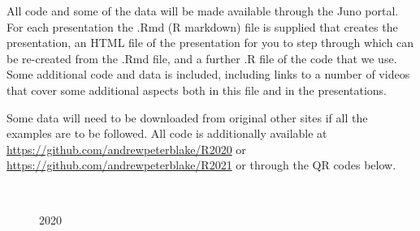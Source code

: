 \documentclass[
  letterpaper,
]{book}
\begin{document}
All code and some of the data will be made available through the Juno
portal. For each presentation the .Rmd (R markdown) file is supplied
that creates the presentation, an HTML file of the presentation for you
to step through which can be re-created from the .Rmd file, and a
further .R file of the code that we use. Some additional code and data
is included, including links to a number of videos that cover some
additional aspects both in this file and in the presentations.

Some data will need to be downloaded from original other sites if all
the examples are to be followed. All code is additionally available at
\url{https://github.com/andrewpeterblake/R2020} or
\url{https://github.com/andrewpeterblake/R2021} or through the QR codes
below.

\begin{figure}

\begin{minipage}[t]{0.05\linewidth}

{\centering 

~

}

\end{minipage}%
%
\begin{minipage}[t]{0.40\linewidth}

{\centering 


\caption{2020}

}

\end{minipage}%
%
\begin{minipage}[t]{0.10\linewidth}


\end{minipage}
\end{figure}
\end{document}
